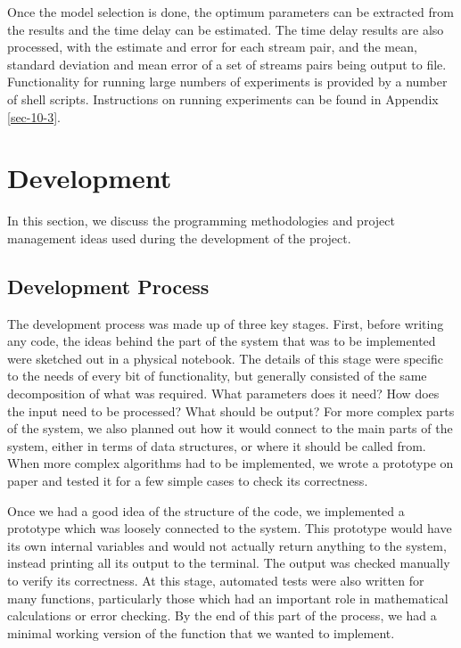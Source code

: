 \documentclass[a4paper,11pt]{article}
\begin{document}
   Once the model selection is done, the optimum parameters can be extracted
   from the results and the time delay can be estimated. The time delay results
   are also processed, with the estimate and error for each stream pair, and the
   mean, standard deviation and mean error of a set of streams pairs being
   output to file. Functionality for running large numbers of experiments is
   provided by a number of shell scripts. Instructions on running experiments
   can be found in Appendix \ref{sec-10-3}.
\section{Development}
\label{sec-4}

  In this section, we discuss the programming methodologies and project management
  ideas used during the development of the project.
\subsection{Development Process}
\label{sec-4-1}

   The development process was made up of three key stages. First, before
   writing any code, the ideas behind the part of the system that was to be
   implemented were sketched out in a physical notebook. The details of this
   stage were specific to the needs of every bit of functionality, but generally
   consisted of the same decomposition of what was required. What parameters
   does it need? How does the input need to be processed? What should be output?
   For more complex parts of the system, we also planned out how it would
   connect to the main parts of the system, either in terms of data structures,
   or where it should be called from. When more complex algorithms had to be
   implemented, we wrote a prototype on paper and tested it for a few simple
   cases to check its correctness.

   Once we had a good idea of the structure of the code, we implemented a
   prototype which was loosely connected to the system. This prototype would
   have its own internal variables and would not actually return anything to the
   system, instead printing all its output to the terminal. The output was
   checked manually to verify its correctness. At this stage, automated tests
   were also written for many functions, particularly those which had an
   important role in mathematical calculations or error checking. By the end of
   this part of the process, we had a minimal working version of the function
   that we wanted to implement.
\end{document}
